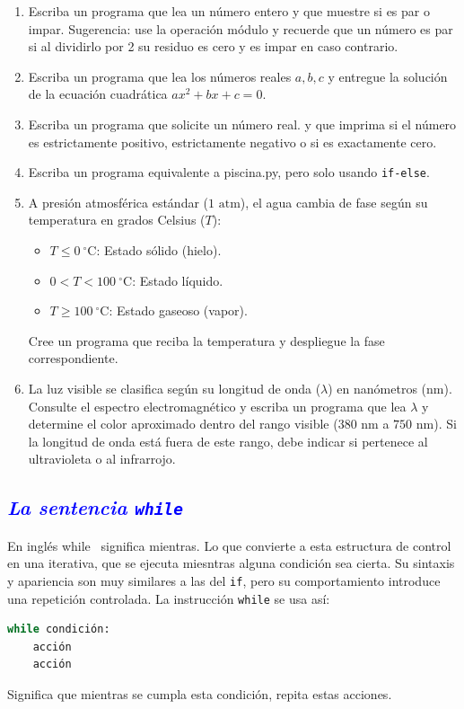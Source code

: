 \documentclass[12pt]{article}
\begin{document}
\begin{problemas}[]
\begin{enumerate}[leftmargin=*]

\item Escriba un programa que lea un número entero y que muestre si es par o impar. 
Sugerencia: use la operación módulo y recuerde que un número es par si al dividirlo por 2
su residuo es cero y es impar en caso contrario.
\item Escriba un programa que lea los números reales $a,b,c$ y entregue la solución 
de la ecuación cuadrática $ax^2 + bx + c = 0$.
\item Escriba un programa que solicite un número real. 
y que imprima si el número es estrictamente positivo, 
estrictamente negativo o si es exactamente cero.
\item Escriba un programa equivalente a piscina.py, pero solo usando \lstinline|if-else|.
\item A presión atmosférica estándar ($1\text{ atm}$), el agua cambia de fase según su temperatura en grados Celsius ($T$):
\begin{itemize}
    \item $T \le 0\ ^\circ\text{C}$: Estado sólido (hielo).
    \item $0 < T < 100\ ^\circ\text{C}$: Estado líquido.
    \item $T \ge 100\ ^\circ\text{C}$: Estado gaseoso (vapor).
\end{itemize}
Cree un programa que reciba la temperatura y despliegue la fase correspondiente.
\item La luz visible se clasifica según su longitud de onda ($\lambda$) en nanómetros ($\text{nm}$). 
Consulte el espectro electromagnético y escriba un programa que lea $\lambda$ y determine el color aproximado dentro del rango 
visible ($380\text{ nm}$ a $750\text{ nm}$). 
Si la longitud de onda está fuera de este rango, 
debe indicar si pertenece al ultravioleta o al infrarrojo.


\end{enumerate}

\end{problemas}

\subsection*{\textcolor{blue}{\textit{La sentencia \texttt{while}}}}

En inglés \guillemotleft while\guillemotright ~ significa \guillemotleft mientras\guillemotright.
Lo que convierte a esta estructura de control en una iterativa, que se ejecuta miesntras alguna condición sea cierta.
Su sintaxis y apariencia son muy 
similares a las del \lstinline|if|, pero su comportamiento introduce una 
repetición controlada. La instrucción \lstinline|while| se usa así:
\begin{lstlisting}[language=Python]
while condición:
    acción 
    acción
\end{lstlisting}
Significa que \guillemotleft mientras se cumpla esta condición, repita estas 
acciones\guillemotright.
\end{document}

